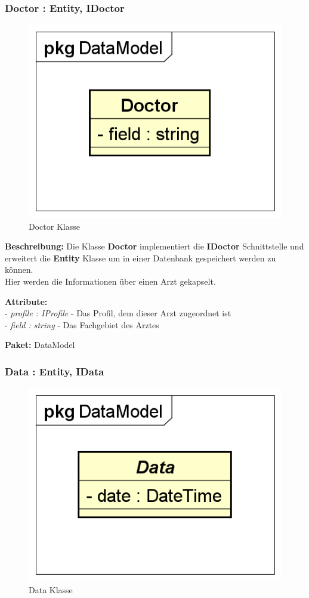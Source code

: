 \documentclass[a4paper]{scrreprt}
\begin{document}
\subsubsection{Doctor : Entity, IDoctor}
\begin{figure}[H]
\centering
\includegraphics[width=0.45\textheight]{graphics/Klassendiagramme/Model/Doctor.png}
\caption{Doctor Klasse}
\end{figure}
\textbf{Beschreibung:} Die Klasse \textbf{Doctor} implementiert die \textbf{IDoctor} Schnittstelle und erweitert die \textbf{Entity} Klasse um in einer Datenbank gespeichert werden zu können.\\
Hier werden die Informationen über einen Arzt gekapselt.

\textbf{Attribute:}\\ 
- \textit{profile : IProfile} - Das Profil, dem dieser Arzt zugeordnet ist\\
- \textit{field : string} - Das Fachgebiet des Arztes

\textbf{Paket:} DataModel

\subsubsection{Data : Entity, IData}
\begin{figure}[H]
\centering
\includegraphics[width=0.45\textheight]{graphics/Klassendiagramme/Model/Data.png}
\caption{Data Klasse}
\end{figure}
\end{document}
